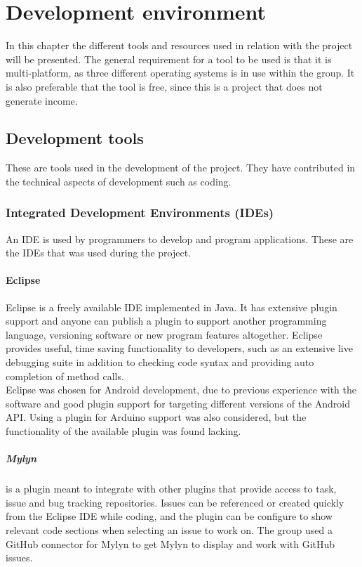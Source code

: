 \chapter{Development environment}
In this chapter the different tools and resources used in relation with the project will be presented. The general requirement for a tool to be used is that it is multi-platform, as three different operating systems is in use within the group. It is also preferable that the tool is free, since this is a project that does not generate income.

\section{Development tools}
These are tools used in the development of the project. They have contributed in the technical aspects of development such as coding.
\subsection{Integrated Development Environments (IDEs)}
An IDE is used by programmers to develop and program applications. These are the IDEs that was used during the project.

\subsubsection{Eclipse}
Eclipse is a freely available IDE implemented in Java. It has extensive plugin support and anyone can publish a plugin to support another programming language, versioning software or new program features altogether. Eclipse provides useful, time saving functionality to developers, such as an extensive live debugging suite in addition to checking code syntax and providing auto completion of method calls.\\
\newline
Eclipse was chosen for Android development, due to previous experience with the software and good plugin support for targeting different versions of the Android API. Using a plugin for Arduino support was also considered, but the functionality of the available plugin was found lacking. %

\paragraph{Mylyn}
is a plugin meant to integrate with other plugins that provide access to task, issue and bug tracking repositories. Issues can be referenced or created quickly from the Eclipse IDE while coding, and the plugin can be configure to show relevant code sections when selecting an issue to work on. The group used a GitHub connector for Mylyn to get Mylyn to display and work with GitHub issues.

